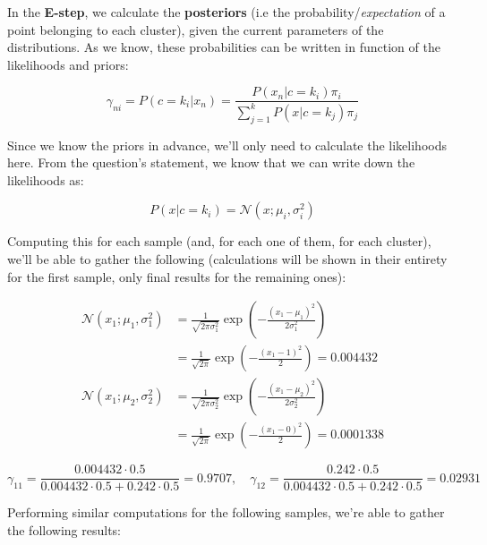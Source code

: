 \documentclass[12pt]{article}
\begin{document}
\begin{enumerate}[leftmargin=\labelsep]
  In the \textbf{E-step}, we calculate the \textbf{posteriors} (i.e the probability/\textit{expectation}
  of a point belonging to each cluster), given the current parameters of the
  distributions. As we know, these probabilities can be written in function of the
  likelihoods and priors:

  \begin{equation*}
    \gamma_{ni} = P(c = k_i | x_n) = \frac{P(x_n | c = k_i) \pi_i}{\sum_{j = 1}^k P(x | c = k_j) \pi_j}
  \end{equation*}

  Since we know the priors in advance, we'll only need to calculate the likelihoods here.
  From the question's statement, we know that we can write down the likelihoods as:

  \begin{equation*}
    P(x | c = k_i) = \mathcal{N}(x; \mu_i, \sigma_i^2)
  \end{equation*}

  Computing this for each sample (and, for each one of them, for each cluster), we'll
  be able to gather the following (calculations will be shown in their entirety for the
  first sample, only final results for the remaining ones):

  \begin{equation*}
    \begin{aligned}
      \mathcal{N} (x_1; \mu_1, \sigma_1^2) & = \frac{1}{\sqrt{2 \pi \sigma_1^2}} \exp \left( - \frac{(x_1 - \mu_1)^2}{2 \sigma_1^2} \right) \\
                                           & = \frac{1}{\sqrt{2 \pi}} \exp \left( - \frac{(x_1 - 1)^2}{2} \right) = 0.004432                \\
      \mathcal{N} (x_1; \mu_2, \sigma_2^2) & = \frac{1}{\sqrt{2 \pi \sigma_2^2}} \exp \left( - \frac{(x_1 - \mu_2)^2}{2 \sigma_2^2} \right) \\
                                           & = \frac{1}{\sqrt{2 \pi}} \exp \left( - \frac{(x_1 - 0)^2}{2} \right) = 0.0001338
    \end{aligned}
  \end{equation*}

  \begin{equation*}
    \gamma_{11} = \frac{0.004432 \cdot 0.5}{0.004432 \cdot 0.5 + 0.242 \cdot 0.5} = 0.9707, \quad
    \gamma_{12} = \frac{0.242 \cdot 0.5}{0.004432 \cdot 0.5 + 0.242 \cdot 0.5} = 0.02931
  \end{equation*}

  Performing similar computations for the following samples, we're able to gather
  the following results:


\end{enumerate}
\end{document}
